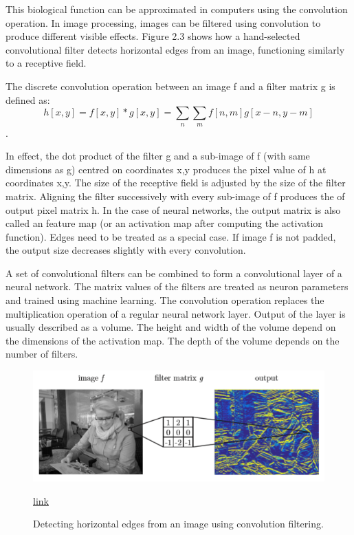 This biological function can be approximated in computers using the convolution operation. In image processing, images can be filtered using convolution to produce different visible effects. Figure 2.3 shows how a hand-selected convolutional filter detects horizontal edges from an image, functioning similarly to a receptive field.

The discrete convolution operation between an image f and a filter matrix g is defined as:\[h[x,y] = f[x,y]*g[x,y] = \sum_{n}\sum_{m}f[n,m]g[x-n,y-m]\].

In effect, the dot product of the filter g and a sub-image of f (with same dimensions as g) centred on coordinates x,y produces the pixel value of h at coordinates x,y. The size of the receptive field is adjusted by the size of the filter matrix. Aligning the filter successively with every sub-image of f produces the of output pixel matrix h. In the case of neural networks, the output matrix is also called an feature map (or an activation map after computing the activation function). Edges need to be treated as a special case. If image f is not padded, the output size decreases slightly with every convolution.

A set of convolutional filters can be combined to form a convolutional layer of a neural network. The matrix values of the filters are treated as neuron parameters and trained using machine learning. The convolution operation replaces the multiplication operation of a regular neural network layer. Output of the layer is usually described as a volume. The height and width of the volume depend on the dimensions of the activation map. The depth of the volume depends on the number of filters.

\begin{figure}
	\centering
	\includegraphics[width=0.7\linewidth]{img3}
	\caption{ Detecting horizontal edges from an image using convolution filtering.} \href{https://www.semanticscholar.org/paper/Object-detection-from-images-using-convolutional-Stenroos/a6ee78ea9c68d99d6545227fed925a721337bb16/figure/2}{link}
	\label{fig:img3}
\end{figure}

